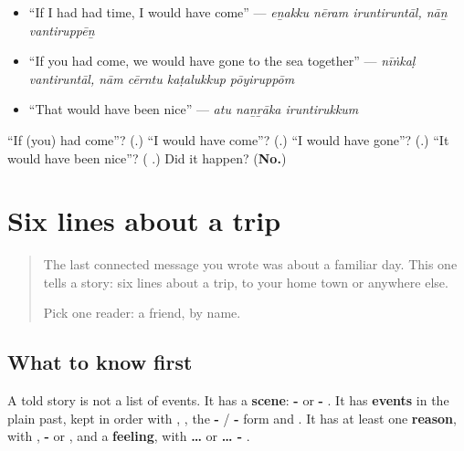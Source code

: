 \begin{itemize}
\raggedright
  \item \textquotedblleft{}If I had had time, I would have come\textquotedblright{} — \emph{eṉakku nēram iruntiruntāl, nāṉ vantiruppēṉ}
  \item \textquotedblleft{}If you had come, we would have gone to the sea together\textquotedblright{} — \emph{nīṅkaḷ vantiruntāl, nām cērntu kaṭalukkup pōyiruppōm}
  \item \textquotedblleft{}That would have been nice\textquotedblright{} — \emph{atu naṉṟāka iruntirukkum}
\end{itemize}

\begin{tcolorbox}[breakable,colback=teal!4,colframe=teal!35!black,title={Before you move on}]
\textquotedblleft{}If (you) had come\textquotedblright{}? (\textbf{}.) \textquotedblleft{}I would have come\textquotedblright{}? (\textbf{}.) \textquotedblleft{}I would have gone\textquotedblright{}? (\textbf{}.) \textquotedblleft{}It would have been nice\textquotedblright{}? (\textbf{ }.) Did it happen? (\textbf{No.})
\end{tcolorbox}
\section[(six lines)]{Six lines about a trip}

\label{lesson:TA-W293-six-lines}



\begin{quote}
The last connected message you wrote was about a familiar day. This one tells a story: six lines about a trip, to your home town or anywhere else.

Pick one reader: a friend, by name.
\end{quote}

\subsection*{What to know first}
A told story is not a list of events. It has a \textbf{scene}: \textbf{-} or \textbf{- }. It has \textbf{events} in the plain past, kept in order with \textbf{}, \textbf{ }, the \textbf{-} / \textbf{-} form and \textbf{}. It has at least one \textbf{reason}, with \textbf{}, \textbf{-} or \textbf{}, and a \textbf{feeling}, with \textbf{ … } or \textbf{ … - }.

